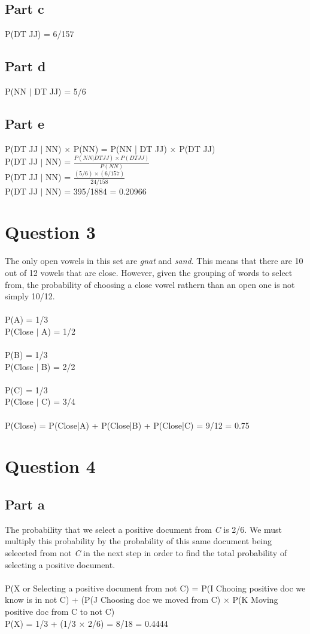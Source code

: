 \documentclass[11pt]{article}
\begin{document}
\subsection*{Part c}
\noindent
P(DT JJ) = 6/157

\subsection*{Part d}
\noindent
P(NN $|$ DT JJ) = 5/6

\subsection*{Part e}
\noindent
P(DT JJ $|$ NN) $ \times $ P(NN) = P(NN | DT JJ) $ \times $ P(DT JJ)\\
P(DT JJ $|$ NN) = $\frac{P(NN | DT JJ) \times  P(DT JJ)}{P(NN)}$\\
P(DT JJ $|$ NN) = $\frac{(5/6) \times (6/157)}{24/158}$\\
P(DT JJ $|$ NN) = 395/1884 = 0.20966

\section*{Question 3}
\noindent
The only open vowels in this set are \textit{gnat} and \textit{sand}. This means that there are 10 out of 12 vowels that are close. However, given the grouping of words to select from, the probability of choosing a close vowel rathern than an open one is not simply 10/12.\\\\
P(A) = 1/3\\
P(Close $|$ A) = 1/2\\\\
P(B) = 1/3\\
P(Close $|$ B) = 2/2\\\\
P(C) = 1/3\\
P(Close $|$ C) = 3/4\\\\
P(Close) = P(Close|A) + P(Close|B) + P(Close|C) = 9/12 = 0.75

\section*{Question 4}

\subsection*{Part a}
\noindent
The probability that we select a positive document from \textit{C} is 2/6. We must multiply this probability by the probability of this same document being seleceted from not \textit{C} in the next step in order to find the total probability of selecting a positive document.\\\\
P(X or Selecting a positive document from not C) = P(I Chooing positive doc we know is in not C) + (P(J Choosing doc we moved from C) $\times$ P(K Moving positive doc from C to not C)\\
P(X) = 1/3 + (1/3 $ \times $ 2/6) = 8/18 = 0.4444
\end{document}
